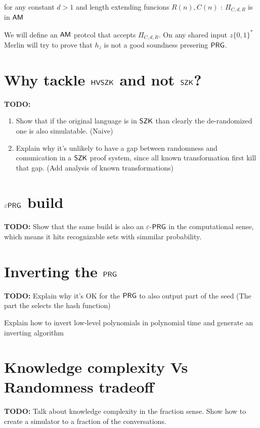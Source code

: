 \documentclass[11]{article}
\newenvironment{proof}[1][Proof]{\begin{trivlist}
\item[\hskip \labelsep {\bfseries #1}]}{\end{trivlist}}
\begin{document}
\begin{claim} {for any constant $d > 1$ and length extending funcions $R(n), C(n)$ :  $\Pi_{C,d,R}$ is in $\mathsf{AM}$}

\begin{proof}

We will define an $\mathsf{AM}$ protcol that accepts $\Pi_{C,d,R}$. On any shared input $z \{0,1\}^*$ Merlin will try to prove that $h_z$ is not a good soundness presering $\mathsf{PRG}$.
\end{proof}

\end{claim}

\section{Why tackle $\mathsf{HVSZK}$ and not $\mathsf{SZK}$?}
\textbf{TODO:}
\begin{enumerate}
	\item Show that if the original language is in $\mathsf{SZK}$ than clearly the de-randomized one is also simulatable. (Naive)
	\item Explain why it's unlikely to have a gap between randomness and comunication in a $\mathsf{SZK}$ proof system, since all known transformation first kill that gap. (Add analysis of known transformations)

	
\end{enumerate}


\section{$\varepsilon \mathsf{PRG}$ build}
\textbf{TODO:}
Show that the same build is also an $\varepsilon$-$\mathsf{PRG}$ in the computational sense, which means it hits recognizable sets with simmilar probability.


\section{Inverting the $\mathsf{PRG}$}
\textbf{TODO:}
Explain why it's OK for the $\mathsf{PRG}$ to also output part of the seed (The part the selects the hash function)

Explain how to invert low-level polynomials in polynomial time and generate an inverting algorithm


\section{Knowledge complexity Vs Randomness tradeoff}
\textbf{TODO:}
Talk about knowledge complexity in the fraction sense. Show how to create a simulator to a fraction of the conversations.
\end{document}
